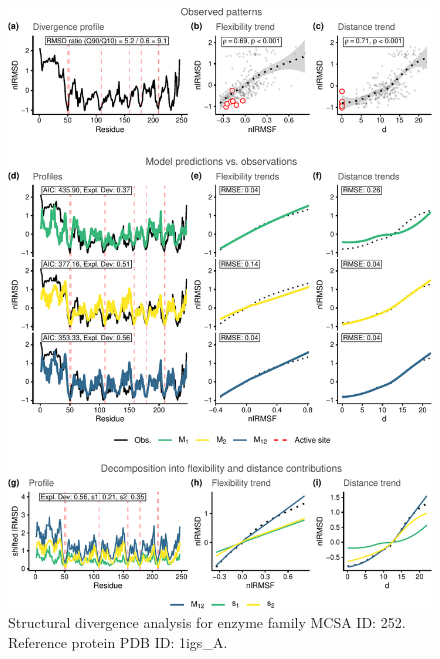 \documentclass[
]{article}
\begin{document}
\clearpage
\begin{figure}[H]
\centering


\begin{center}\includegraphics{supplementary_material_files/figure-latex/generate_figures-12} \end{center}

\caption{Structural divergence analysis for enzyme family MCSA ID: 252. Reference protein PDB ID: 1igs\_A.}
\end{figure}
\end{document}

